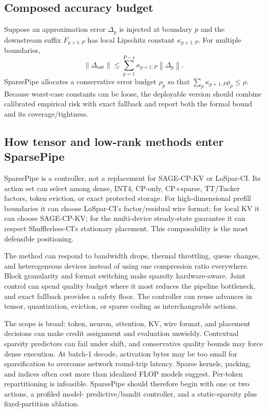 \documentclass[10pt]{article}
\newcommand{\norm}[1]{\left\lVert #1\right\rVert}
\begin{document}
\subsection{Composed accuracy budget}

Suppose an approximation error $\Delta_p$ is injected at boundary $p$ and the downstream suffix
$F_{p+1:P}$ has local Lipschitz constant $\kappa_{p+1:P}$. For multiple boundaries,
\[
\norm{\Delta_{\mathrm{out}}}
\le \sum_{p=1}^{P-1}\kappa_{p+1:P}\norm{\Delta_p}.
\]
SparsePipe allocates a conservative error budget $\rho_p$ so that
$\sum_p\kappa_{p+1:P}\rho_p\le\rho$. Because worst-case constants can be loose, the deployable
version should combine calibrated empirical risk with exact fallback and report both the formal
bound and its coverage/tightness.

\subsection{How tensor and low-rank methods enter SparsePipe}

SparsePipe is a controller, not a replacement for SAGE-CP-KV or LoSpar-CI. Its action set can
select among dense, INT4, CP-only, CP+sparse, TT/Tucker factors, token eviction, or exact protected
storage. For high-dimensional prefill boundaries it can choose LoSpar-CI's factor/residual wire
format; for local KV it can choose SAGE-CP-KV; for the multi-device steady-state guarantee it can
respect Shufflerless-CI's stationary placement. This composability is the most defensible
positioning.

\begin{donebox}[title={Expected advantages}]
The method can respond to bandwidth drops, thermal throttling, queue changes, and heterogeneous
devices instead of using one compression ratio everywhere. Block granularity and format switching
make sparsity hardware-aware. Joint control can spend quality budget where it most reduces the
pipeline bottleneck, and exact fallback provides a safety floor. The controller can reuse advances
in tensor, quantization, eviction, or sparse coding as interchangeable actions.
\end{donebox}

\begin{riskbox}[title={Possible limitations}]
The scope is broad: token, neuron, attention, KV, wire format, and placement decisions can make
credit assignment and evaluation unwieldy. Contextual sparsity predictors can fail under shift,
and conservative quality bounds may force dense execution. At batch-1 decode, activation bytes
may be too small for sparsification to overcome network round-trip latency. Sparse kernels,
packing, and indices often cost more than idealized FLOP models suggest. Per-token repartitioning
is infeasible. SparsePipe should therefore begin with one or two actions, a profiled model-
predictive/bandit controller, and a static-sparsity plus fixed-partition ablation.
\end{riskbox}
\end{document}
